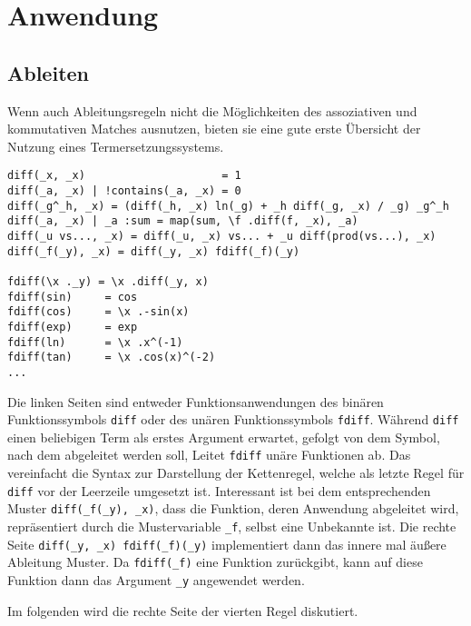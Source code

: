 \section{Anwendung} \label{subsecCppAnwendung}

\subsection{Ableiten} \label{subsubsecDiff}

Wenn auch Ableitungsregeln nicht die Möglichkeiten des assoziativen und kommutativen Matches ausnutzen, bieten sie eine gute erste Übersicht der Nutzung eines Termersetzungssystems.

\begin{verbatim}
diff(_x, _x)                     = 1
diff(_a, _x) | !contains(_a, _x) = 0
diff(_g^_h, _x) = (diff(_h, _x) ln(_g) + _h diff(_g, _x) / _g) _g^_h
diff(_a, _x) | _a :sum = map(sum, \f .diff(f, _x), _a)
diff(_u vs..., _x) = diff(_u, _x) vs... + _u diff(prod(vs...), _x)
diff(_f(_y), _x) = diff(_y, _x) fdiff(_f)(_y)

fdiff(\x ._y) = \x .diff(_y, x)
fdiff(sin)     = cos
fdiff(cos)     = \x .-sin(x)
fdiff(exp)     = exp
fdiff(ln)      = \x .x^(-1)
fdiff(tan)     = \x .cos(x)^(-2)
...
\end{verbatim}

Die linken Seiten sind entweder Funktionsanwendungen des binären Funktionssymbols \verb|diff| oder des unären Funktionssymbols \verb|fdiff|. Während \verb|diff| einen beliebigen Term als erstes Argument erwartet, gefolgt von dem Symbol, nach dem abgeleitet werden soll, Leitet \verb|fdiff| unäre Funktionen ab. Das vereinfacht die Syntax zur Darstellung der Kettenregel, welche als letzte Regel für \verb|diff|  vor der Leerzeile umgesetzt ist. Interessant ist bei dem entsprechenden Muster \verb|diff(_f(_y), _x)|, dass die Funktion, deren Anwendung abgeleitet wird, repräsentiert durch die Mustervariable \verb|_f|, selbst eine Unbekannte ist. Die rechte Seite \verb|diff(_y, _x) fdiff(_f)(_y)| implementiert dann das \glqq innere mal äußere Ableitung \glqq{} Muster. Da \verb|fdiff(_f)| eine Funktion zurückgibt, kann auf diese Funktion dann das Argument \verb|_y| angewendet werden.

Im folgenden wird die rechte Seite der vierten Regel diskutiert.

